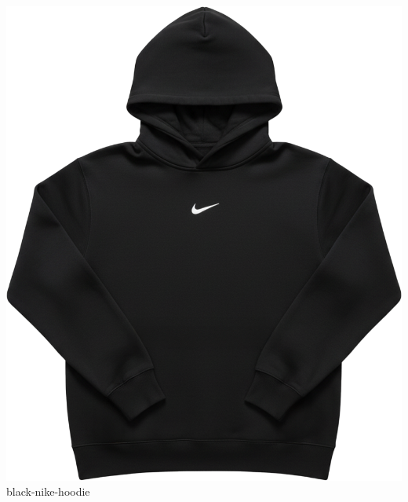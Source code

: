\documentclass[10pt]{article}
\begin{document}
\
\vspace{2mm}\
\begin{minipage}[t]{0.22\textwidth}\centering\vspace{0mm}
\includegraphics[width=\linewidth,keepaspectratio]{assets/midlayer/black-nike-hoodie.png}\\
\vspace{0.5mm}\tiny black-nike-hoodie\end{minipage}
\newpage
\end{document}
